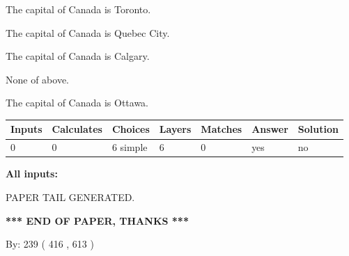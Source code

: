\documentclass[12pt]{article}
\begin{document}
 
The capital of Canada is Toronto.
 
 
The capital of Canada is Quebec City.
 
 
The capital of Canada is Calgary.
 
 
 None of above.
 
 
\noindent{}
 
 
The capital of Canada is Ottawa.
 
 
\noindent{}
 
 
   
   
   
   
\noindent\begin{tabular}{|l|l|l|l|l|l|l|}
 \hline
Inputs & Calculates & Choices & Layers & Matches & Answer & Solution \\ \hline
 0  & 
 0  & 
 6
  simple  
  & 
 6  & 
 0  & 
  yes & 
  no 
  \\ \hline
 \end{tabular}
   
   
   
   
\noindent{}
   
   
   
   
\noindent\vspace{0.1in}\hspace{-0.08in} {\textbf{\Large{All inputs: }}}
   
   
   
   
   
   
 \vspace{0.2in}
 
   
   
\vspace{2.0in} PAPER TAIL GENERATED.
   
   
   
   
\vspace{1.0in} 
{\textbf{\large{ *** END OF PAPER, THANKS *** }}} 
   
   
\hspace{1.0in} By: 
 239 ( 416 ,  613 )
   
   
   
   
\newpage 
\setcounter{page}{ 
   418001 } 
   
\end{document}
